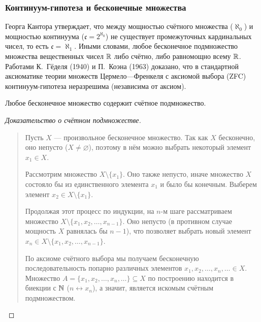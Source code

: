 \subsubsection{Континуум-гипотеза и бесконечные множества}

\begin{remark}
     Георга Кантора утверждает, что между 
    мощностью счётного множества ($\aleph_0$) и мощностью континуума 
    ($\mathfrak{c} = 2^{\aleph_0}$) не существует промежуточных кардинальных 
    чисел, то есть $\mathfrak{c} = \aleph_1$. Иными словами, любое 
    бесконечное подмножество множества вещественных чисел $\mathbb{R}$ либо счётно, 
    либо равномощно всему $\mathbb{R}$. Работами К.~Гёделя (1940) и П.~Коэна (1963) 
    доказано, что в стандартной аксиоматике теории множеств Цермело---Френкеля 
    с аксиомой выбора (ZFC) континуум-гипотеза неразрешима (независима от 
    аксиом).
\end{remark}

\begin{theorem}
    Любое бесконечное множество содержит счётное подмножество.
\end{theorem}

\begin{proof}[Доказательство о счётном подмножестве]~\\
    \begin{quote}
        Пусть $X$ --- произвольное бесконечное множество. Так как $X$ 
        бесконечно, оно непусто ($X \neq \varnothing$), поэтому в нём можно 
        выбрать некоторый элемент $x_1 \in X$.

        Рассмотрим множество $X \setminus \{x_1\}$. Оно также непусто, 
        иначе множество $X$ состояло бы из единственного элемента $x_1$ и 
        было бы конечным. Выберем элемент $x_2 \in X \setminus \{x_1\}$.

        Продолжая этот процесс по индукции, на $n$-м шаге рассматриваем 
        множество $X \setminus \{x_1, x_2, \dots, x_{n-1}\}$. Оно непусто 
        (в противном случае мощность $X$ равнялась бы $n - 1$), что 
        позволяет выбрать новый элемент 
        $x_n \in X \setminus \{x_1, x_2, \dots, x_{n-1}\}$.

        По аксиоме счётного выбора мы получаем бесконечную 
        последовательность попарно различных элементов 
        $x_1, x_2, \dots, x_n, \dots \in X$. Множество 
        $A = \{x_1, x_2, \dots, x_n, \dots\} \subseteq X$ по построению 
        находится в биекции с $\mathbb{N}$ ($n \leftrightarrow x_n$), а значит, 
        является искомым счётным подмножеством.
    \end{quote}
\end{proof}